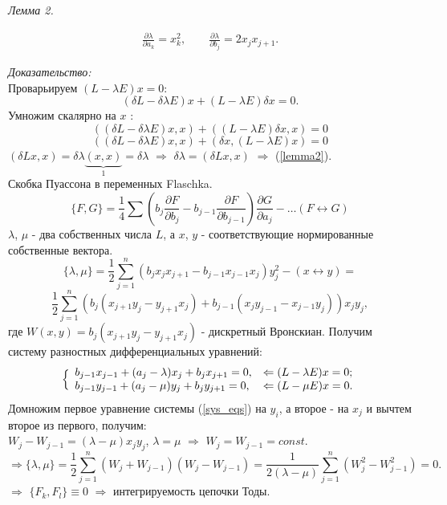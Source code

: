 \documentclass[a4paper,12pt]{article}
\theoremstyle{definition}
\theoremstyle{definition}
\theoremstyle{definition}
\newcommand{\bear}[1]{\begin{eqnarray}\label{#1}}
\newcommand{\ear}{\end{eqnarray}}
\begin{document}
\textit{Лемма 2.}

\bear{lemma2}
\frac{\partial \lambda}{\partial a_{k}} = x^{2}_{k}, \qquad \frac{\partial \lambda}{\partial b_{j}} = 2x_{j}x_{j+1}.
\ear


\textit{Доказательство:}\\


Проварьируем $(L - \lambda E)x = 0$:\\
\[(\delta L - \delta \lambda E)x + (L - \lambda E)\delta x = 0.\]
Умножим скалярно на $x$ :
\[\left((\delta L - \delta \lambda E)x,x\right) + \left((L-\lambda E)\delta x,x \right) = 0\]
\[\left((\delta L - \delta \lambda E)x,x\right) + \left(\delta x, (L-\lambda E)x \right) = 0\]
$\left(\delta L x,x\right) = \delta \lambda \underbrace{(x,x)}_{1} = \delta \lambda$ $\Rightarrow$ $\delta\lambda = (\delta L x,x)$ $\Rightarrow$ (\ref{lemma2}).\\

Скобка Пуассона в переменных Flaschka.
\[\{F,G\} = \frac 14 \sum \left(b_{j}\frac{\partial F}{\partial b_{j}} - b_{j-1}\frac{\partial F}{\partial b_{j-1}}\right)\frac{\partial G}{\partial a_{j}} - \ldots (F\leftrightarrow G)\]
$\lambda$, $\mu$ - два собственных числа $L$, а $x$, $y$ - соответствующие  нормированные собственные вектора.
\[\{\lambda, \mu\} = \frac 12  \sum^{n}_{j=1}\left(b_{j}x_{j}x_{j+1} - b_{j-1}x_{j-1}x_{j}\right)y^{2}_{j} - (x\leftrightarrow y) =\]
\[\frac12 \sum^{n}_{j=1} \left(b_{j}(x_{j+1}y_{j} - y_{j+1}x_{j}) + b_{j-1}(x_{j}y_{j-1} - x_{j-1}y_{j}) \right) x_{j}y_{j},\]
где $W(x,y) = b_{j}(x_{j+1}y_{j} - y_{j+1}x_{j}) $ - дискретный Вронскиан.
Получим систему разностных дифференциальных уравнений:
\bear{sys_eqs}\Bigl\{
    \begin{array}{ll}
      b_{j-1}x_{j-1} + (a_{j} - \lambda)x_{j} + b_{j}x_{j+1} = 0 \textrm{,} & \Leftarrow (L-\lambda E)x =0\textrm{;} \\
      b_{j-1}y_{j-1} + (a_{j} - \mu)y_{j} + b_{j}y_{j+1} = 0 \textrm{,} & \Leftarrow (L-\mu E)x =0 \textrm{.}
    \end{array}
\ear
Домножим первое уравнение системы (\ref{sys_eqs}) на $y_{i}$, а второе - на $x_{j}$ и вычтем второе из первого, получим:\\
$W_{j} - W_{j-1} = (\lambda - \mu)x_{j}y_{j}$, $\lambda = \mu$ $\Rightarrow$ $W_{j} = W_{j-1} = const$.\\
\[\Rightarrow \{\lambda, \mu\} = \frac 12 \sum^{n}_{j=1} \left(W_{j} + W_{j-1}\right)\left(W_{j}  - W_{j-1}\right) = \frac{1}{2(\lambda - \mu)}\sum^{n}_{j=1}\left(W^{2}_{j} - W^{2}_{j-1}\right) =0.\]
$\Rightarrow$ $\{F_{k}, F_{l}\} \equiv 0$ $\Rightarrow$  интегрируемость цепочки Тоды.\\
\end{document}
